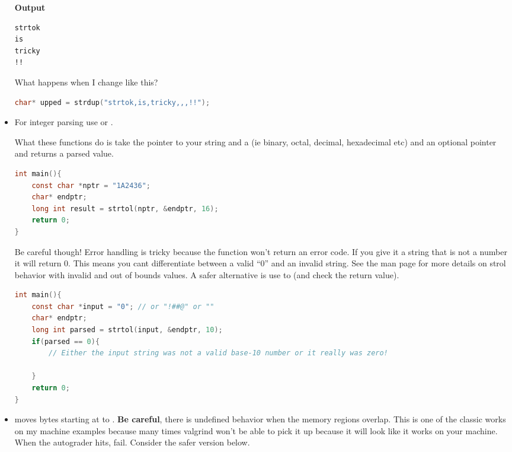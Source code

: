 \begin{itemize}
	      \textbf{Output}

	      \begin{lstlisting}[language=console]
strtok
is
tricky
!!
\end{lstlisting}

	      What happens when I change  like this?

	      \begin{lstlisting}[language=C]
char* upped = strdup("strtok,is,tricky,,,!!");
\end{lstlisting}

	\item For integer parsing use
	      or
	      .

	      What these functions do is take the pointer to your string
	       and a  (ie binary, octal, decimal,
	      hexadecimal etc) and an optional pointer  and returns a
	      parsed value.

	      \begin{lstlisting}[language=C]
int main(){
    const char *nptr = "1A2436";
    char* endptr;
    long int result = strtol(nptr, &endptr, 16);
    return 0;
}
\end{lstlisting}

	      Be careful though! Error handling is tricky because the function won't return an error code. If you give it a string that is not a number it will return 0. This means you cant differentiate between a valid ``0'' and an invalid string. See the man page for more details on strol behavior with invalid and out of bounds values. A safer alternative is use to  (and check the return value).

	      \begin{lstlisting}[language=C]
int main(){
    const char *input = "0"; // or "!##@" or ""
    char* endptr;
    long int parsed = strtol(input, &endptr, 10);
    if(parsed == 0){
        // Either the input string was not a valid base-10 number or it really was zero!

    }
    return 0;
}
\end{lstlisting}

	\item {} moves  bytes starting at  to . \textbf{Be careful}, there is undefined behavior when the memory regions overlap. This is one of the classic works on my machine examples because many times valgrind won't be able to pick it up because it will look like it works on your machine. When the autograder hits, fail. Consider the safer version below.


\end{itemize}
